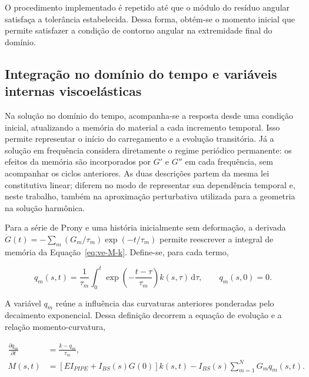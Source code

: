 \documentclass[arial,centeredequations,english,brazilian,oneside,section=TITLE]{ifes8}
\begin{document}
O procedimento implementado é repetido até que o módulo do resíduo angular
satisfaça a tolerância estabelecida. Dessa forma,
obtém-se o momento inicial que permite satisfazer a condição
de contorno angular na extremidade final do domínio.

\subsection{Integração no domínio do tempo e variáveis internas
viscoelásticas}
\label{subsec:integracao-temporal}

Na solução no domínio do tempo, acompanha-se a resposta desde uma condição inicial,
atualizando a memória do material a cada incremento temporal. Isso permite representar
o início do carregamento e a evolução transitória. Já a solução em frequência considera
diretamente o regime periódico permanente: os efeitos da memória são incorporados por
$G'$ e $G''$ em cada frequência, sem acompanhar os ciclos anteriores.
As duas descrições partem da mesma lei constitutiva linear; diferem no modo de
representar sua dependência temporal e, neste trabalho, também na aproximação
perturbativa utilizada para a geometria na solução harmônica.

Para a série de Prony e uma história inicialmente sem deformação, a derivada
$\dot G(t)=-\sum_m(G_m/\tau_m)\exp(-t/\tau_m)$ permite reescrever a integral
de memória da Equação~\eqref{eq:ve-M-k}. Define-se, para cada termo,

\begin{equation}
  q_m(s,t)=\frac{1}{\tau_m}\int_0^t
    \exp\left(-\frac{t-\tau}{\tau_m}\right)k(s,\tau)\,\mathrm{d}\tau,
  \qquad q_m(s,0)=0.
  \label{eq:definicao-variavel-interna}
\end{equation}

A variável $q_m$ reúne a influência das curvaturas anteriores ponderadas pelo
decaimento exponencial. Dessa definição decorrem a equação de evolução e a relação
momento-curvatura,

\begin{align}
  \frac{\partial q_m}{\partial t}&=\frac{k-q_m}{\tau_m},
    \label{eq:evolucao-variavel-interna}\\
  M(s,t)&=\left[EI_{PIPE}+I_{BS}(s)G(0)\right]k(s,t)
    -I_{BS}(s)\sum_{m=1}^{N}G_m q_m(s,t).
    \label{eq:momento-variaveis-internas}
\end{align}
\end{document}
